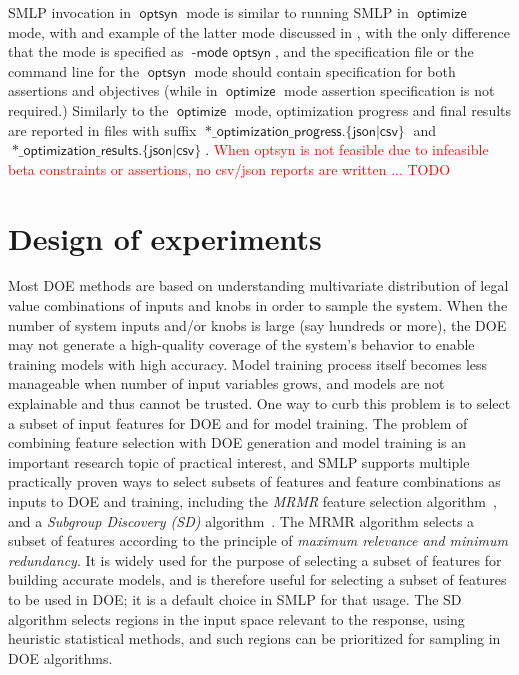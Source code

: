 \documentclass[a4paper,parskip=half]{article} %
\newcommand*\option[1]{\operatorname{\mathsf{#1}}} %
\newcommand*\optionval[2]{\operatorname{\mathsf{#1}\,\,\mathsf{#2}}} %
\newcommand*\suffix[1]{\operatorname{\mathsf{#1}}} %
\newcommand*\mode[1]{\operatorname{\mathsf{#1}}} %
\newcommand\todozk[1]{\textcolor{red}{#1}}
\newcommand*\ZK{\todozk}
\begin{document}
SMLP invocation in $\mode{optsyn}$ mode is similar to running SMLP in $\mode{optimize}$ mode, with and example of the latter 
mode discussed in , with the only difference that the mode is specified as $\optionval{-mode}{optsyn}$, and
the specification file or the command line for the  $\option{optsyn}$ mode should contain specification for
both assertions and objectives (while in  $\option{optimize}$ mode assertion specification is not required.)
Similarly to the $\option{optimize}$ mode, optimization progress and final results are reported in files with suffix
$\suffix{*\_optimization\_progress.\{json|csv\}}$ and  $\suffix{*\_optimization\_results.\{json|csv\}}$. 
\ZK{When optsyn is not feasible due to infeasible beta constraints or assertions, no csv/json reports are written ... TODO}

 
\section{Design of experiments}\label{sec:doe}

Most DOE methods are based on understanding multivariate distribution of legal value combinations
of inputs and knobs in order to sample the system.
When the number of system inputs and/or knobs is large (say hundreds or more), the DOE may not  generate  
a high-quality coverage of the system’s behavior to enable training models with high accuracy.
Model training process itself becomes less manageable when number of input variables grows,
and models are not explainable and thus cannot be trusted.
One way to curb this problem is to select a subset of input features for DOE and for model training.
The problem of combining feature selection with DOE generation and model training
is an important research topic of practical interest, and SMLP supports multiple practically proven ways
to select subsets of features and feature combinations as inputs to DOE and training, including the \emph{MRMR}
feature selection algorithm~\cite{DBLP:journals/jbcb/DingP05}, and a \emph{Subgroup Discovery (SD)}
algorithm~\cite{DBLP:books/mit/fayyadPSU96/Klosgen96,DBLP:conf/pkdd/Wrobel97,DBLP:journals/widm/Atzmueller15}.
The MRMR algorithm selects a subset of features according to the principle of \emph{maximum relevance and 
minimum redundancy}. It is widely used for the purpose of selecting a subset of features for building accurate models,
and is therefore useful for selecting a subset of features to be used in DOE; it is a default choice in SMLP for that usage.
The SD algorithm selects regions in the input space relevant to the response, using heuristic statistical methods,
and such regions can be prioritized for sampling in DOE algorithms.
\end{document}
